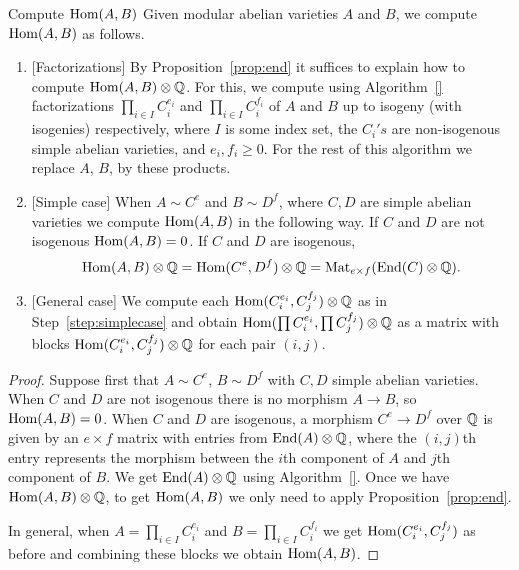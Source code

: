 \documentclass{article}
\begin{document}
\begin{algorithm}{Compute $\operatorname{Hom}(A,B)$}
Given  modular abelian varieties $A$ and $B$, we
compute $\operatorname{Hom}(A,B)$ as follows.
\begin{enumerate}
\item{} [Factorizations]
By Proposition~\ref{prop:end} it suffices to explain how
to compute $\operatorname{Hom}(A,B)\otimes \mathbb{Q}$.
For this, we compute using Algorithm~\ref{}
  factorizations $\prod_{i \in I} C_i^{e_i}$ and $\prod_{i \in I}
  C_i^{f_i}$ of $A$ and $B$ up to isogeny (with isogenies)
respectively, where $I$ is some index set,
  the $C_i's$ are non-isogenous simple abelian varieties, and $e_i,
  f_i \geq 0$.  For the rest of this algorithm
we replace $A$, $B$, by these products.
\item{} [Simple case]\label{step:simplecase} When $A \sim C^e$ and $B \sim D^f$, where $C, D$ are simple
abelian varieties we compute $\operatorname{Hom}(A,B)$ in the following way. If $C$ and
$D$ are not isogenous $\operatorname{Hom}(A,B) = 0$. If $C$ and $D$ are isogenous,
$$
  \operatorname{Hom}(A,B)\otimes\mathbb{Q} = \operatorname{Hom}(C^e, D^f) \otimes \mathbb{Q} = \operatorname{Mat}_{e \times f} (\operatorname{End}(C) \otimes \mathbb{Q}).
$$
\item{} [General case] We compute each $\operatorname{Hom}(C_i^{e_i}, C_j^{f_j})\otimes\mathbb{Q}$ as in Step~\ref{step:simplecase}
and obtain $\operatorname{Hom}(\prod C_i^{e_i}, \prod C_j^{f_j})\otimes\mathbb{Q}$ as a
matrix with blocks $\operatorname{Hom}(C_i^{e_i},C_j^{f_j})\otimes\mathbb{Q}$ for each pair $(i,j)$.
\end{enumerate}
\end{algorithm}
\begin{proof}
Suppose first that $A \sim C^e$, $B \sim D^f$ with $C,D$ simple abelian varieties.
When $C$ and $D$ are not isogenous there is no morphism $A \to B$, so
$\operatorname{Hom}(A,B) =  0$. When $C$ and $D$ are isogenous, a morphism $C^e \to D^f$
over $\mathbb{Q}$ is given by an $e \times f$ matrix with entries from $\operatorname{End}(A) \otimes
\mathbb{Q}$, where the $(i,j)$th entry represents the morphism between the $i$th
component of $A$ and $j$th component of $B$. We get $\operatorname{End}(A) \otimes \mathbb{Q}$
using Algorithm~\ref{}. Once we have $\operatorname{Hom}(A,B)
\otimes \mathbb{Q}$, to get $\operatorname{Hom}(A,B)$ we only need to apply Proposition~\ref{prop:end}.

In general, when $A = \prod_{i \in I} C_i^{e_i}$ and $B = \prod_{i \in I}
C_i^{f_i}$ we get $\operatorname{Hom}(C_i^{e_i}, C_j^{f_j})$ as before and combining these
blocks we obtain $\operatorname{Hom}(A,B)$.
\end{proof}
\end{document}
